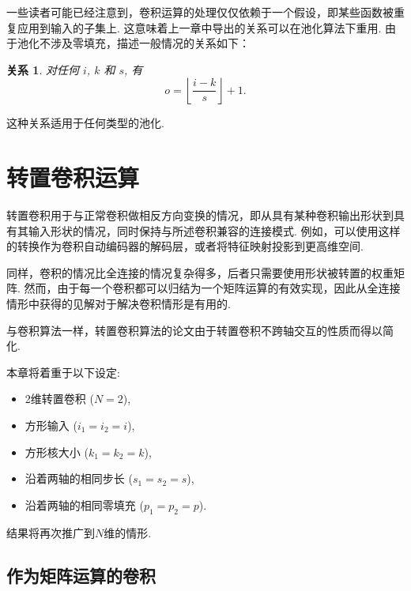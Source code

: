 \documentclass[notitlepage]{ctexrep}
\newtheorem{relationship}{关系}
\begin{document}
一些读者可能已经注意到，卷积运算的处理仅仅依赖于一个假设，即某些函数被重复应用到输入的子集上. 这意味着上一章中导出的关系可以在池化算法下重用. 由于池化不涉及零填充，描述一般情况的关系如下： 

\begin{relationship}\label{rel:pooling}
对任何 $i$, $k$ 和 $s$, 有
\begin{equation*}
    o = \left\lfloor \frac{i - k}{s} \right\rfloor + 1.
\end{equation*}
\end{relationship}

\noindent 这种关系适用于任何类型的池化.

\chapter{转置卷积运算}

转置卷积用于与正常卷积做相反方向变换的情况，即从具有某种卷积输出形状到具有其输入形状的情况，同时保持与所述卷积兼容的连接模式. 例如，可以使用这样的转换作为卷积自动编码器的解码层，或者将特征映射投影到更高维空间.

同样，卷积的情况比全连接的情况复杂得多，后者只需要使用形状被转置的权重矩阵. 然而，由于每一个卷积都可以归结为一个矩阵运算的有效实现，因此从全连接情形中获得的见解对于解决卷积情形是有用的.

与卷积算法一样，转置卷积算法的论文由于转置卷积不跨轴交互的性质而得以简化.

本章将着重于以下设定:

\begin{itemize}
    \item 2维转置卷积 ($N = 2$),
    \item 方形输入 ($i_1 = i_2 = i$),
    \item 方形核大小 ($k_1 = k_2 = k$),
    \item 沿着两轴的相同步长 ($s_1 = s_2 = s$),
    \item 沿着两轴的相同零填充 ($p_1 = p_2 = p$).
\end{itemize}

\noindent 结果将再次推广到$N$维的情形.

\section{作为矩阵运算的卷积}
\end{document}
